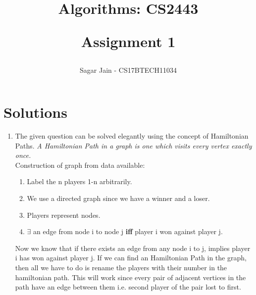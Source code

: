 \documentclass[a4paper,12pt]{report}
\begin{document}
\title{
Algorithms: CS2443\\
\begin{large}
Assignment 1
\end{large}
}
\author{Sagar Jain - CS17BTECH11034\\}
\maketitle
\section*{Solutions}
\begin{enumerate}
\item The given question can be solved elegantly using the concept of Hamiltonian Paths. \textit{A Hamiltonian Path in a graph is one which visits every vertex exactly once.}
\\Construction of graph from data available:
\begin{enumerate}
\item Label the n players 1-n arbitrarily.
\item We use a directed graph since we have a winner and a loser.
\item Players represent nodes.
\item $\exists$ an edge from node i to node j \textbf{iff} player i won against player j.
\end{enumerate}
Now we know that if there exists an edge from any node i to j, implies player i has won against player j. If we can find an Hamiltonian Path in the graph, then all we have to do is rename the players with their number in the hamiltonian path. This will work since every pair of adjacent vertices in the path have an edge between them i.e. second player of the pair lost to first.

\end{enumerate}
\end{document}
